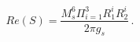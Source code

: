 \begin{equation}
Re(S)=  \frac{M_s^6 \Pi_{i=1}^{3} R_1^{i} R_2^{i}}{2\pi g_{s}}\, .
\end{equation}


